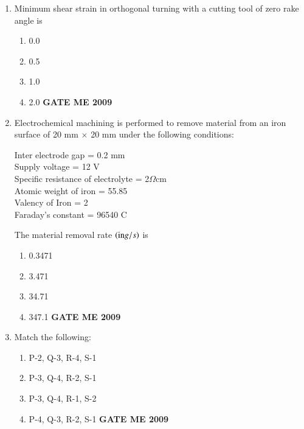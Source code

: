 \documentclass[journal]{IEEEtran}
\begin{document}
\begin{enumerate}[leftmargin=0pt]
\item Minimum shear strain in orthogonal turning with a cutting tool of zero rake angle is
\begin{enumerate}[label=(\Alph*)]
  \item 0.0
  \item 0.5
  \item 1.0
  \item 2.0
\hfill{\textbf{GATE ME 2009}}
\end{enumerate}


\item Electrochemical machining is performed to remove material from an iron surface of 20 mm $\times$ 20 mm under the following conditions: 
\begin{center}
    Inter electrode gap = 0.2 mm\\
    Supply voltage = 12 V\\
    Specific resistance of electrolyte = 2$\Omega$cm\\
    Atomic weight of iron = 55.85\\
    Valency of Iron = 2\\
    Faraday's constant = 96540 C\\
\end{center}
The material removal rate $\left(\text{in} g/s\right)$ is
\begin{enumerate}[label=(\Alph*)]
  \item 0.3471
  \item 3.471
  \item 34.71
  \item 347.1
\hfill{\textbf{GATE ME 2009}}
\end{enumerate}

\item Match the following:\\
\begin{table}[h]
    \centering
    
    
\end{table}
\begin{enumerate}[label=(\Alph*)]
  \item P-2, Q-3, R-4, S-1
  \item P-3, Q-4, R-2, S-1
  \item P-3, Q-4, R-1, S-2
  \item P-4, Q-3, R-2, S-1
\hfill{\textbf{GATE ME 2009}}
\end{enumerate}


\end{enumerate}
\end{document}
